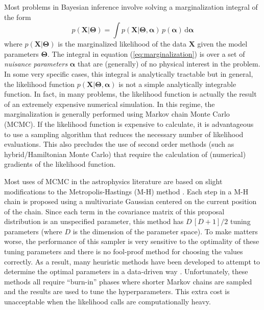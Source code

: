 \documentclass[12pt,preprint]{aastex}
\newcommand{\eq}[1]{equation (\ref{eq:#1})}
\newcommand{\eqlabel}[1]{\label{eq:#1}}
\newcommand{\dd}{\mathrm{d}}
\begin{document}
Most problems in Bayesian inference involve solving a marginalization integral of
the form
\begin{equation}
    \eqlabel{marginalization}
    p (\mathbf{X} | \boldsymbol{\Theta}) = \int
        p (\mathbf{X} | \boldsymbol{\Theta},\boldsymbol{\alpha}) \,
        p (\boldsymbol{\alpha}) \, \dd \boldsymbol{\alpha}
\end{equation}
where $p (\mathbf{X} | \boldsymbol{\Theta})$ is the marginalized likelihood of the
data $\mathbf{X}$ given the model parameters $\boldsymbol{\Theta}$. The integral in
\eq{marginalization} is over a set of \emph{nuisance parameters} $\boldsymbol{\alpha}$
that are (generally) of no physical interest in the problem. In some very specific
cases, this integral is analytically tractable but in general, the likelihood function
$p (\mathbf{X} | \boldsymbol{\Theta},\boldsymbol{\alpha})$ is not a simple analytically
integrable function. In fact, in many problems, the likelihood function is actually
the result of an extremely expensive numerical simulation. In this regime, the
marginalization is generally performed using Markov chain Monte Carlo (MCMC).
If the likelihood function is expensive to calculate, it is advantageous to use a
sampling algorithm that reduces the necessary number of likelihood evaluations.
This also precludes the use of second order methods (such as hybrid/Hamiltonian
Monte Carlo) that require the calculation of (numerical) gradients of the likelihood
function.

Most uses of MCMC in the astrophysics literature are based on slight modifications
to the Metropolis-Hastings (M-H) method \citep[e.g.][]{MacKay:2003}. Each step in
a M-H chain is proposed using a multivariate Gaussian centered on the current
position of the chain. Since each term in the covariance matrix of this proposal
distribution is an unspecified parameter, this method has $D\,[D+1]/2$ tuning parameters
(where $D$ is the dimension of the parameter space).  To make matters worse, the
performance of this sampler is very sensitive to the optimality of these tuning
parameters and there is no fool-proof method for choosing the values correctly.
As a result, many heuristic methods have been developed to attempt to determine
the optimal parameters in a data-driven way \citep[e.g.][]{Gregory:2005,Dunkley:2005,Widrow:2008}.
Unfortunately, these methods all require ``burn-in'' phases where shorter Markov chains
are sampled and the results are used to tune the hyperparameters. This extra cost
is unacceptable when the likelihood calls are computationally heavy.
\end{document}
